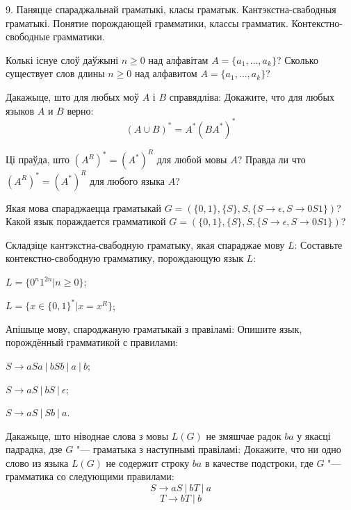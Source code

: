 \documentclass[12pt, a4paper]{article}
\begin{document}
\biLangHeader
{9. Паняцце спараджальнай граматыкі, класы граматык. Кантэкстна-свабодныя граматыкі.}
{Понятие порождающей грамматики, классы грамматик. Контекстно-свободные грамматики.}

\begin{problemList}

\problemItemSimple
{Колькі існуе слоў даўжыні $n \ge 0$ над алфавітам $A=\{a_1, \ldots, a_k\}$?}
{Сколько существует слов длины $n \ge 0$ над алфавитом $A=\{a_1, \ldots, a_k\}$?}

\bigskip

\problemItemWithCommonPart
{Дакажыце, што для любых моў $A$ і $B$ справядліва:}
{Докажите, что для любых языков $A$ и $B$ верно:}
{\[ (A\cup B)^*=A^*(BA^*)^* \]}

\medskip

\problemItemSimple
{Ці праўда, што $(A^R)^*=(A^*)^R$ для любой мовы $A$?}
{Правда ли что $(A^R)^*=(A^*)^R$ для любого языка $A$?}

\bigskip

\problemItemSimple
{Якая мова спараджаецца граматыкай $G=(\{0, 1\}, \{S\}, S, \{S\rightarrow \epsilon, S\rightarrow 0S1\})$?}
{Какой язык пораждается грамматикой $G=(\{0, 1\}, \{S\}, S, \{S\rightarrow \epsilon, S\rightarrow 0S1\})$?}

\bigskip

\problemItemWithCommonPart
{Складзіце кантэкстна-свабодную граматыку, якая спараджае мову $L$:}
{Составьте контекстно-свободную грамматику, порождающую язык $L$:}
{%
\begin{belarusianEnumerate}
    \item $L=\{0^n1^{2n}|n\ge 0\}$;
    \item $L=\{x\in\{0, 1\}^*|x=x^R\}$;
\end{belarusianEnumerate}
}

\smallskip

\problemItemWithCommonPart
{Апішыце мову, спароджаную граматыкай з правіламі:}
{Опишите язык, порождённый грамматикой с правилами:}
{%
\begin{belarusianEnumerate}
    \item $S\rightarrow aSa\ |\ bSb\ |\ a\ |\ b$;
    \item $S\rightarrow aS\ |\ bS\ |\ \epsilon$;
    \item $S\rightarrow aS\ |\ Sb\ |\ a$.
\end{belarusianEnumerate}
}

\smallskip

\problemItemWithCommonPart
{Дакажыце, што ніводнае слова з мовы $L(G)$ не змяшчае радок $ba$ у якасці падрадка,
дзе $G$ "--- граматыка з наступнымі правіламі:}
{Докажите, что ни одно слово из языка $L(G)$ не содержит строку $ba$ в качестве подстроки,
где $G$ "--- грамматика со следующими правилами:}
{%
\[ S \rightarrow aS\ |\ bT\ |\ a \]
\[ T \rightarrow bT\ |\ b \]
}


\end{problemList}
\end{document}
